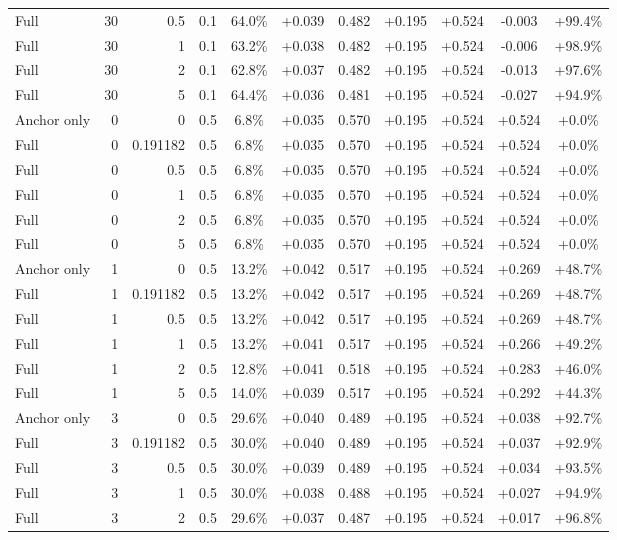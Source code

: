 \begin{table}[htbp]
\begin{tabular}{lrrrccccccc}
Full & 30 & 0.5 & 0.1 & 64.0\% & +0.039 & 0.482 & +0.195 & +0.524 & -0.003 & +99.4\% \\
Full & 30 & 1 & 0.1 & 63.2\% & +0.038 & 0.482 & +0.195 & +0.524 & -0.006 & +98.9\% \\
Full & 30 & 2 & 0.1 & 62.8\% & +0.037 & 0.482 & +0.195 & +0.524 & -0.013 & +97.6\% \\
Full & 30 & 5 & 0.1 & 64.4\% & +0.036 & 0.481 & +0.195 & +0.524 & -0.027 & +94.9\% \\
Anchor only & 0 & 0 & 0.5 & 6.8\% & +0.035 & 0.570 & +0.195 & +0.524 & +0.524 & +0.0\% \\
Full & 0 & 0.191182 & 0.5 & 6.8\% & +0.035 & 0.570 & +0.195 & +0.524 & +0.524 & +0.0\% \\
Full & 0 & 0.5 & 0.5 & 6.8\% & +0.035 & 0.570 & +0.195 & +0.524 & +0.524 & +0.0\% \\
Full & 0 & 1 & 0.5 & 6.8\% & +0.035 & 0.570 & +0.195 & +0.524 & +0.524 & +0.0\% \\
Full & 0 & 2 & 0.5 & 6.8\% & +0.035 & 0.570 & +0.195 & +0.524 & +0.524 & +0.0\% \\
Full & 0 & 5 & 0.5 & 6.8\% & +0.035 & 0.570 & +0.195 & +0.524 & +0.524 & +0.0\% \\
Anchor only & 1 & 0 & 0.5 & 13.2\% & +0.042 & 0.517 & +0.195 & +0.524 & +0.269 & +48.7\% \\
Full & 1 & 0.191182 & 0.5 & 13.2\% & +0.042 & 0.517 & +0.195 & +0.524 & +0.269 & +48.7\% \\
Full & 1 & 0.5 & 0.5 & 13.2\% & +0.042 & 0.517 & +0.195 & +0.524 & +0.269 & +48.7\% \\
Full & 1 & 1 & 0.5 & 13.2\% & +0.041 & 0.517 & +0.195 & +0.524 & +0.266 & +49.2\% \\
Full & 1 & 2 & 0.5 & 12.8\% & +0.041 & 0.518 & +0.195 & +0.524 & +0.283 & +46.0\% \\
Full & 1 & 5 & 0.5 & 14.0\% & +0.039 & 0.517 & +0.195 & +0.524 & +0.292 & +44.3\% \\
Anchor only & 3 & 0 & 0.5 & 29.6\% & +0.040 & 0.489 & +0.195 & +0.524 & +0.038 & +92.7\% \\
Full & 3 & 0.191182 & 0.5 & 30.0\% & +0.040 & 0.489 & +0.195 & +0.524 & +0.037 & +92.9\% \\
Full & 3 & 0.5 & 0.5 & 30.0\% & +0.039 & 0.489 & +0.195 & +0.524 & +0.034 & +93.5\% \\
Full & 3 & 1 & 0.5 & 30.0\% & +0.038 & 0.488 & +0.195 & +0.524 & +0.027 & +94.9\% \\
Full & 3 & 2 & 0.5 & 29.6\% & +0.037 & 0.487 & +0.195 & +0.524 & +0.017 & +96.8\% \\

\end{tabular}
\end{table}
